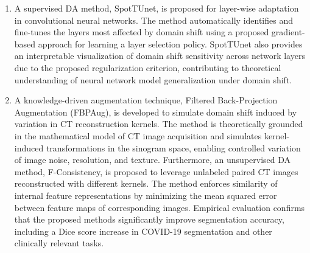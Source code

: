 \begin{enumerate}
	
	\item A supervised DA method, SpotTUnet, is proposed for layer-wise adaptation in convolutional neural networks. The method automatically identifies and fine-tunes the layers most affected by domain shift using a proposed gradient-based approach for learning a layer selection policy. SpotTUnet also provides an interpretable visualization of domain shift sensitivity across network layers due to the proposed regularization criterion, contributing to theoretical understanding of neural network model generalization under domain shift.
	
	
	\item A knowledge-driven augmentation technique, Filtered Back-Projection Augmentation (FBPAug), is developed to simulate domain shift induced by variation in CT reconstruction kernels. The method is theoretically grounded in the mathematical model of CT image acquisition and simulates kernel-induced transformations in the sinogram space, enabling controlled variation of image noise, resolution, and texture. Furthermore, an unsupervised DA method, F-Consistency, is proposed to leverage unlabeled paired CT images reconstructed with different kernels. The method enforces similarity of internal feature representations by minimizing the mean squared error between feature maps of corresponding images. Empirical evaluation confirms that the proposed methods significantly improve segmentation accuracy, including a Dice score increase in COVID-19 segmentation and other clinically relevant tasks.
    

\end{enumerate}
